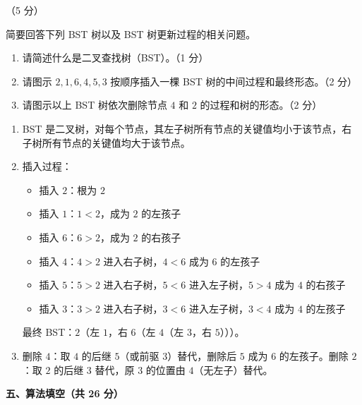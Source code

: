 \begin{question}[二叉查找树]（5 分）

简要回答下列 BST 树以及 BST 树更新过程的相关问题。

\begin{enumerate}[label=(\arabic*)]
  \item 请简述什么是二叉查找树（BST）。（1 分）
  \item 请图示 $2,1,6,4,5,3$ 按顺序插入一棵 BST 树的中间过程和最终形态。（2 分）
  \item 请图示以上 BST 树依次删除节点 $4$ 和 $2$ 的过程和树的形态。（2 分）
\end{enumerate}

\begin{solution}
\begin{enumerate}[label=(\arabic*)]
  \item BST 是二叉树，对每个节点，其左子树所有节点的关键值均小于该节点，右子树所有节点的关键值均大于该节点。
  \item 插入过程：
    \begin{itemize}
      \item 插入 $2$：根为 $2$
      \item 插入 $1$：$1<2$，成为 $2$ 的左孩子
      \item 插入 $6$：$6>2$，成为 $2$ 的右孩子
      \item 插入 $4$：$4>2$ 进入右子树，$4<6$ 成为 $6$ 的左孩子
      \item 插入 $5$：$5>2$ 进入右子树，$5<6$ 进入左子树，$5>4$ 成为 $4$ 的右孩子
      \item 插入 $3$：$3>2$ 进入右子树，$3<6$ 进入左子树，$3<4$ 成为 $4$ 的左孩子
    \end{itemize}
    最终 BST：$2$（左 $1$，右 $6$（左 $4$（左 $3$，右 $5$）））。
  \item 删除 $4$：取 $4$ 的后继 $5$（或前驱 $3$）替代，删除后 $5$ 成为 $6$ 的左孩子。删除 $2$：取 $2$ 的后继 $3$ 替代，原 $3$ 的位置由 $4$（无左子）替代。
\end{enumerate}
\end{solution}
\end{question}

\clearpage

\textbf{五、算法填空（共 26 分）}

